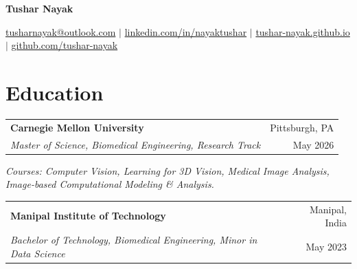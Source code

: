 \documentclass[letterpaper,10pt]{article}
\makeatletter
\newlength{\entrygap}
\newcommand{\cvEntry}[4]{%
  \needspace{4\baselineskip}%
  \begin{tabularx}{\textwidth}{@{}X@{\hspace{0.5em}}r@{}}
    \textbf{#1} & {\small #2}\\[-1pt]
    {\small\textit{#3}} & {\small #4}
  \end{tabularx}\par\vspace{1pt}%
}
\makeatother
\begin{document}
\begin{center}
  {\LARGE \bfseries Tushar Nayak}\par\vspace{3pt}
  {\small
    \faEnvelope \hspace{0.5pt} \href{mailto:tusharnayak@outlook.com}{tusharnayak@outlook.com}
    \enspace$|$\enspace
    \faLinkedin \hspace{0.5pt} \href{https://linkedin.com/in/nayaktushar}{linkedin.com/in/nayaktushar}
    \enspace$|$\enspace
    \faGlobe \hspace{0.5pt} \href{https://tushar-nayak.github.io}{tushar-nayak.github.io}
    \enspace$|$\enspace
    \faGithub \hspace{0.5pt} \href{https://github.com/tushar-nayak}{github.com/tushar-nayak}
  }\par
\end{center}
\vspace{-6pt}


\section{Education}
\cvEntry{Carnegie Mellon University}{Pittsburgh, PA}
  {Master of Science, Biomedical Engineering, Research Track}{May 2026}
{\small\textit{Courses: Computer Vision, Learning for 3D Vision, Medical Image Analysis,
Image-based Computational Modeling \& Analysis.}}\par\vspace{\entrygap}
\cvEntry{Manipal Institute of Technology}{Manipal, India}
  {Bachelor of Technology, Biomedical Engineering, Minor in Data Science}{May 2023}
\end{document}
